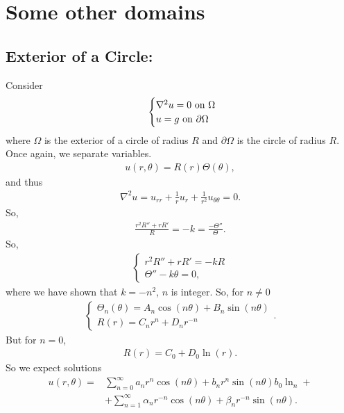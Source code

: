 \documentclass{book}
\theoremstyle{definition}
\newcommand{\p}{\partial}
\newcommand{\f}[2]{\frac{#1}{#2}}
\begin{document}
\section{Some other domains}

\subsection{Exterior of a Circle:} 
Consider
\begin{align*}
\hspace{0.5cm}\begin{cases}
\nabla^2 u = 0 \text{ on }\Omega\\
u=g \text{ on $\p\Omega$}
\end{cases}
\end{align*}
where $\Omega$ is the exterior of a circle of radius $R$ and $\p\Omega$ is the circle of radius $R$. Once again, we separate variables.
\begin{align*}
u(r,\theta) = R(r)\Theta(\theta),
\end{align*}
and thus
\begin{align*}
\nabla^2 u = u_{rr} + \f{1}{r}u_r + \f{1}{r^2}u_{\theta\theta} = 0.
\end{align*}
So,
\begin{align*}
\f{r^2R'' + rR'}{R} = -k = \f{-\Theta''}{\Theta}.
\end{align*}
So,
\begin{align*}
\begin{cases}
r^2R'' + rR' = -kR\\
\Theta'' - k\theta = 0,
\end{cases}
\end{align*}
where we have shown that $k = -n^2$, $n$ is integer. So, for $n\neq 0$
\begin{align*}
\begin{cases}
\Theta_n(\theta) = A_n\cos(n\theta) + B_n\sin(n\theta)\\
R(r) = C_nr^n + D_nr^{-n}
\end{cases}.
\end{align*}
But for $n=0$, 
\begin{align*}
R(r) = C_0+D_0\ln(r).
\end{align*}
So we expect solutions %
\begin{align*}
u(r,\theta) =& \sum^\infty_{n=0} a_n r^n \cos(n\theta) + b_n r^{n}\sin(n\theta) b_0\ln_n +\\
&+\sum^\infty_{n=1}\alpha_n r^{-n}\cos(n\theta) + \beta_n r^{-n}\sin(n\theta). 
\end{align*}
\end{document}
